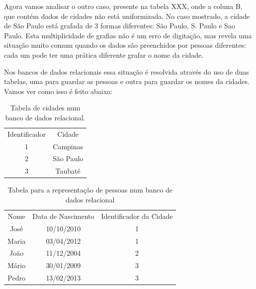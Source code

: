 \documentclass[
12pt,		%
openright,	%
twoside,  %
a4paper,			%
chapter=TITLE,		%
english,			%
french,				%
spanish,			%
brazil				%
]{USPSC-classe/USPSC}
\begin{document}
Agora vamos analisar o outro caso, presente na tabela XXX, onde a coluna B, que cont\'em dados de cidades n\~ao est\'a uniformizada. No caso mostrado, a cidade de S\~ao Paulo est\'a grafada de 3 formas diferentes: S\~ao Paulo, S. Paulo e Sao Paulo. Esta multiplicidade de grafias n\~ao \'e um erro de digita\c{c}\~ao, mas revela uma situa\c{c}\~ao muito comum quando os dados s\~ao preenchidos por pessoas diferentes: cada um pode ter uma pr\'atica diferente grafar o nome da cidade.










Nos bancos de dados relacionais essa situa\c{c}\~ao \'e resolvida atrav\'es do uso de duas tabelas, uma para guardar as pessoas e outra para guardar os nomes da cidades. Vamos ver como isso \'e feito abaixo:














\begin{table}[htb]
\tiny
\caption{\label{e4d91173469576e32f3571663aaeb94e34415b3e}Tabela de cidades num banco de dados relacional.}

\centering
\begin{tabular}{|c|c|}
\hline
Identificador  &  Cidade \\
1  &  Campinas \\
2  &  S\~ao Paulo \\
3  &  Taubat\'e \\
\hline
\end{tabular}
\end{table}






\begin{table}[htb]
\tiny
\caption{\label{559b867b37e81cc1a5e7621bf9c9ed9b847f27fc}Tabela para a representa\c{c}\~ao de pessoas num banco de dados relacional}

\centering
\begin{tabular}{|c|c|c|}
\hline
Nome  &  Data de Nascimento  &  Identificador da Cidade \\
Jos\'e  &  10/10/2010  &  1 \\
Maria  & 03/04/2012  &  1 \\
Jo\~ao  &  11/12/2004  &  2 \\
M\'ario  & 30/01/2009  &  3 \\
Pedro  & 13/02/2013  &  3 \\
\hline
\end{tabular}
\end{table}
\end{document}
